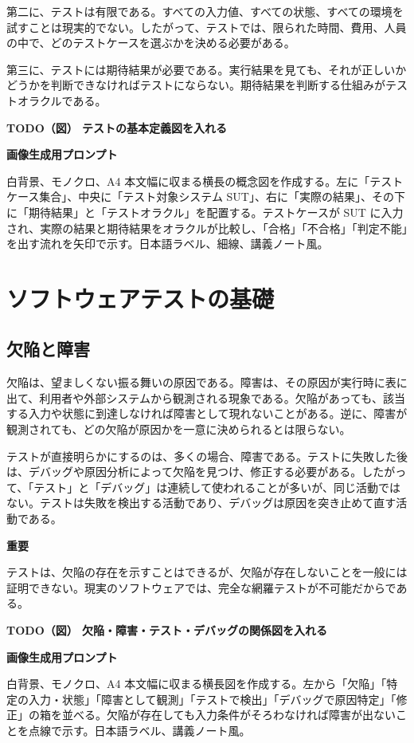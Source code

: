 \documentclass[uplatex,dvipdfmx,a4paper,11pt,nomag]{jsarticle}
\newenvironment{pointbox}[1]{\par\medskip\begin{shaded}\noindent\textbf{#1}\par\smallskip\noindent}{\end{shaded}\par\medskip}
\newenvironment{todobox}[2]{\par\medskip\begin{framed}\noindent\textbf{TODO（図） #1}\par\smallskip\noindent\textbf{画像生成用プロンプト}\par\smallskip\noindent #2\par\smallskip}{\end{framed}\par\medskip}
\begin{document}
第二に、テストは有限である。すべての入力値、すべての状態、すべての環境を試すことは現実的でない。したがって、テストでは、限られた時間、費用、人員の中で、どのテストケースを選ぶかを決める必要がある。

第三に、テストには期待結果が必要である。実行結果を見ても、それが正しいかどうかを判断できなければテストにならない。期待結果を判断する仕組みがテストオラクルである。

\begin{todobox}{テストの基本定義図を入れる}{白背景、モノクロ、A4 本文幅に収まる横長の概念図を作成する。左に「テストケース集合」、中央に「テスト対象システム SUT」、右に「実際の結果」、その下に「期待結果」と「テストオラクル」を配置する。テストケースが SUT に入力され、実際の結果と期待結果をオラクルが比較し、「合格」「不合格」「判定不能」を出す流れを矢印で示す。日本語ラベル、細線、講義ノート風。}
\end{todobox}

\section{ソフトウェアテストの基礎}
\subsection{欠陥と障害}
欠陥は、望ましくない振る舞いの原因である。障害は、その原因が実行時に表に出て、利用者や外部システムから観測される現象である。欠陥があっても、該当する入力や状態に到達しなければ障害として現れないことがある。逆に、障害が観測されても、どの欠陥が原因かを一意に決められるとは限らない。

テストが直接明らかにするのは、多くの場合、障害である。テストに失敗した後は、デバッグや原因分析によって欠陥を見つけ、修正する必要がある。したがって、「テスト」と「デバッグ」は連続して使われることが多いが、同じ活動ではない。テストは失敗を検出する活動であり、デバッグは原因を突き止めて直す活動である。

\begin{pointbox}{重要}
テストは、欠陥の存在を示すことはできるが、欠陥が存在しないことを一般には証明できない。現実のソフトウェアでは、完全な網羅テストが不可能だからである。
\end{pointbox}

\begin{todobox}{欠陥・障害・テスト・デバッグの関係図を入れる}{白背景、モノクロ、A4 本文幅に収まる横長図を作成する。左から「欠陥」「特定の入力・状態」「障害として観測」「テストで検出」「デバッグで原因特定」「修正」の箱を並べる。欠陥が存在しても入力条件がそろわなければ障害が出ないことを点線で示す。日本語ラベル、講義ノート風。}
\end{todobox}
\end{document}
